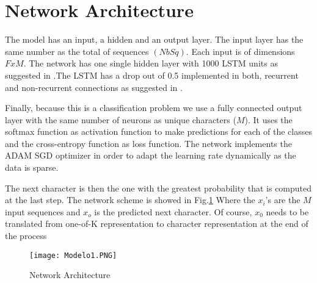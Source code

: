 \section{Network Architecture}

The model has an input, a hidden and an output layer. The input layer has the same number as the total of sequences $(NbSq)$. Each input is of dimensions $FxM$. The network has one single hidden layer with 1000 LSTM units as suggested in \cite{graves2013generating}.The LSTM has a drop out of 0.5 implemented  in both, recurrent and non-recurrent connections as suggested in \cite{gal2015theoretically}. 

Finally, because this is a classification problem we use a fully connected output layer with the same number of neurons as unique characters ($M$). It uses the softmax function as activation function to make predictions for each of the classes and the cross-entropy function as loss function. The network implements the  ADAM SGD optimizer in order to adapt the learning rate dynamically as the data is sparse. 

The next character is then the one with the greatest probability that is computed at the last step. The network scheme is showed in Fig.\ref{fig:netarch}  Where the $x_{i}$'s are the $M$ input sequences and $x_o$ is the predicted next character. Of course, $x_0$ needs to be translated from one-of-K representation to character representation at the end of the process

\begin{figure}[h]
\centering
\texttt{[image: Modelo1.PNG]}
\caption{Network Architecture}
\label{fig:netarch}
\end{figure}























